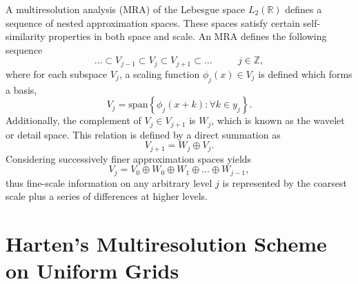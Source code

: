 \documentclass[12pt,letterpaper]{article}
\begin{document}
    A multiresolution analysis (MRA) of the Lebesgue space
    $L_{2}(\mathbb{R})$ defines a sequence of nested approximation spaces.
    These spaces satisfy certain self-similarity properties in both space
    and scale. An MRA defines the following sequence
    \begin{equation*}
        \dots \subset V_{j-1} \subset V_{j} \subset V_{j+1} \subset \dots \text{ }
        \text{ } \text{ } \text{ } j\in \mathbb{Z},
    \end{equation*}
    where for each subspace $V_{j}$,
    a scaling function $\phi_{j}(x) \in V_{j}$ is defined which forms a basis,
    \begin{equation*}
        V_{j} = \text{span} \left\{ \phi_{j}(x+k) : \forall k \in y_{j}
        \right\}.
    \end{equation*}
    Additionally, the complement of $V_{j} \in V_{j+1}$ is $W_{j}$, which is
    known as the wavelet or detail space. This relation is defined
    by a direct summation as
    \begin{equation*}
        V_{j+1} = W_{j} \oplus V_{j}.
    \end{equation*}
    Considering successively finer approximation spaces yields
    \begin{equation*}
        V_j = V_0 \oplus W_0 \oplus W_1 \oplus \dots \oplus W_{j-1},
    \end{equation*}
    thus fine-scale information on any arbitrary level $j$ is represented by
    the coarsest scale plus a series of differences at higher levels.

\section{Harten's Multiresolution Scheme on Uniform Grids}
\end{document}
